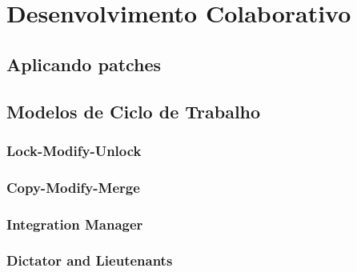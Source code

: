 \chapter{Desenvolvimento Colaborativo}
\section{Aplicando patches}
\section{Modelos de Ciclo de Trabalho}
\subsection{Lock-Modify-Unlock}
\subsection{Copy-Modify-Merge}
\subsection{Integration Manager}
\subsection{Dictator and Lieutenants}